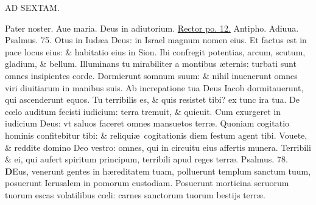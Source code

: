 \documentclass[a5paper,10pt]{book}
\def\ae{æ}
\def\oe{œ}
\begin{document}
\begin{multicols*}{2}
\begin{center}
AD SEXTAM.
\end{center}
\vspace{-1em}
\par \noindent \color{red} P\color{black}ater noster. Aue maria. Deus in adiutorium. \hyperlink{Rectorpo}{Rector po. 12.} \color{red} Antipho. \color{black} Adiuua. \color{red} Psalmus. \hypertarget{ps75}{75.} \color{black}
Otus in Iud\ae a Deus: in Israel magnum nomen eius.
\newline \color{red} E\color{black}t factus est in pace locus eius: \& habitatio eius in Sion.
\newline \color{red} I\color{black}bi confregit potentias, arcum, scutum, gladium, \& bellum.%
\newline \color{red} I\color{black}lluminans tu mirabiliter a montibus \ae ternis: turbati sunt omnes insipientes corde.
\newline \color{red} D\color{black}ormierunt somnum suum: \& nihil inuenerunt omnes viri diuitiarum in manibus suis.
\newline \color{red} A\color{black}b increpatione tua Deus Iacob dormitauerunt, qui ascenderunt equos.
\newline \color{red} T\color{black}u terribilis es, \& quis resistet tibi? ex tunc ira tua.
\newline \color{red} D\color{black}e c\oe lo auditum fecisti iudicium: terra tremuit, \& quieuit.
\newline \color{red} C\color{black}um exurgeret in iudicium Deus: vt saluos faceret omnes mansuetos terr\ae .
\newline \color{red} Q\color{black}uoniam cogitatio hominis confitebitur tibi: \& reliqui\ae \ cogitationis diem festum agent tibi.
\newline \color{red} V\color{black}ouete, \& reddite domino Deo vestro: omnes, qui in circuitu eius affertis munera.
\newline \color{red} T\color{black}erribili \& ei, qui aufert spiritum principum, terribili apud reges terr\ae .
\newline \color{red} Psalmus. \hypertarget{ps78}{78.} \color{black}
\vspace{-.25em}
\lettrine[lines=2]{\bfseries \color{red} D}{}Eus, venerunt gentes in h\ae reditatem tuam, polluerunt templum sanctum tuum, posuerunt Ierusalem in pomorum custodiam.
\newline \color{red} P\color{black}osuerunt morticina seruorum tuorum escas volatilibus c\oe li: carnes sanctorum tuorum bestijs terr\ae .

\end{multicols*}
\end{document}
